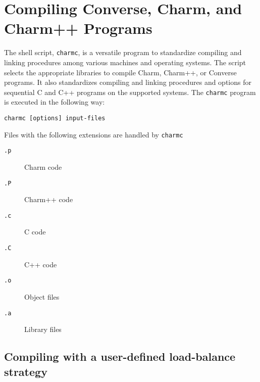 %
%
%
%
%
%
%
%

\section{Compiling Converse, Charm, and Charm++ Programs}

The shell script, {\tt charmc}, is a versatile program to standardize
compiling and linking procedures among various machines and operating
systems.  The script selects the appropriate libraries to compile
Charm, Charm++, or Converse programs.  It also standardizes compiling
and linking procedures and options for sequential C and C++ programs
on the supported systems.  The {\tt charmc} program is executed in the
following way:

\begin{verbatim}
charmc [options] input-files
\end{verbatim}

Files with the following extensions are handled by {\verb+charmc+}
\begin{description}
\item[{\verb+.p+}] Charm code
\item[{\verb+.P+}] Charm++ code
\item[{\verb+.c+}] C code
\item[{\verb+.C+}] C++ code
\item[{\verb+.o+}] Object files
\item[{\verb+.a+}] Library files
\end{description}

\subsection{Compiling with a user-defined load-balance strategy}

